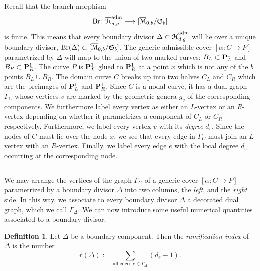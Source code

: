 \documentclass[reqno, 10 pt]{article}
\theoremstyle{definition}
\newtheorem{defn}[thm]{Definition}
\theoremstyle{remark}
\numberwithin{equation}{section}
\numberwithin{thm}{section}
\numberwithin{prop}{section}
\numberwithin{lem}{section}
\numberwithin{cor}{section}
\numberwithin{conj}{section}
\numberwithin{defn}{section}
\newcommand{\M}{\mathcal M}
\renewcommand{\H}{\mathcal H}
\renewcommand{\to}{\longrightarrow}
\renewcommand{\P}{{\bf P}}
\newcommand{\Br}{{\rm Br}}
\renewcommand{\H}{{\mathcal{H}}}
\begin{document}
\subsection{}
  Recall that the branch morphism \[\Br \colon \overline{\H}^{\rm{adm}}_{d,g} \to [\overline{\M}_{0,b}/\mathfrak{S}_{b}]\] is finite.  This means that every boundary divisor $\Delta \subset \overline{\H}^{\rm{adm}}_{d,g}$ will lie over a unique boundary divisor, $\Br(\Delta) \subset  [\overline{\M}_{0,b}/\mathfrak{S}_{b}]$.  The generic admissible cover $[\alpha \colon C \longrightarrow P]$ parametrized by $\Delta$ will map to the union of two marked curves: $B_L \subset {\P^1_{L}}$ and $B_R \subset {\bf P}^{1}_R$.   The curve $P$ is $\P^1_{L} $ glued to ${\bf P}^{1}_R$ at a point $x$ which is not any of the $b$ points $B_{L} \cup B_{R}$.   The domain curve $C$ breaks up into two halves $C_L$ and $C_R$ which are the preimages of $\P^1_{L}$ and ${\bf P}^{1}_R$.  Since $C$ is a nodal curve, it has a dual graph $\Gamma_{C}$ whose vertices $v$ are marked by the geometric genera $g_v$ of the corresponding components. We furthermore label every vertex  as either an $L$-vertex or an $R$-vertex depending on whether it parametrizes a component of $C_L$ or $C_R$ respectively. Furthermore, we label every vertex $v$ with its {\sl degree} $d_v$.  Since the nodes of $C$ must lie over the node $x$, we see that every edge in $\Gamma_{C}$ must join an $L$-vertex with an $R$-vertex. Finally, we label every edge $e$ with the local degree $d_e$  occurring at the corresponding node. 


\subsection{} 
  We may arrange the vertices of the graph $\Gamma_C$ of a generic cover $[\alpha \colon C \longrightarrow P]$ parametrized by a boundary divisor $\Delta$ into two columns, the {\sl left}, and the {\sl right} side.  In this way, we associate to every boundary divisor $\Delta$ a decorated dual graph, which we call $\Gamma_{\Delta}$. We can now introduce some useful numerical quantities associated to a boundary divisor.


  \begin{defn}\label{ramificationdegree}
  Let $\Delta$ be a boundary component.  Then the {\sl ramification index} of $\Delta$ is the number $$r(\Delta) := \sum_{\text{all edges $e \in \Gamma_{\Delta}$}}(d_{e}-1).$$
  \end{defn}
\end{document}
